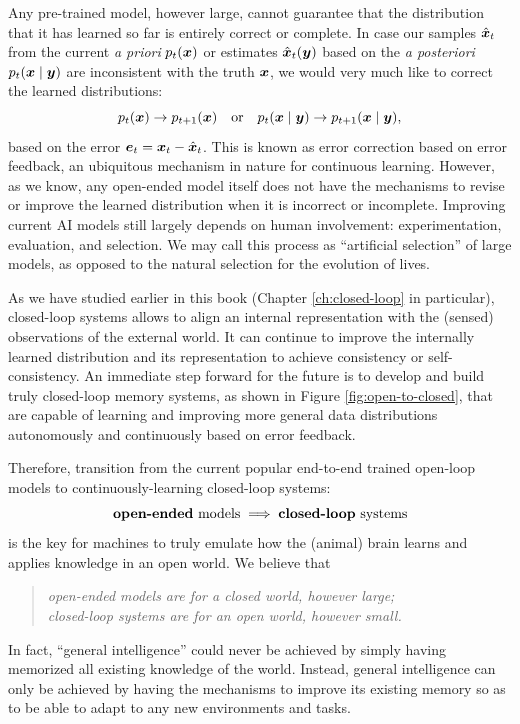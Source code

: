 \documentclass[../../book-main.tex]{subfiles}
\begin{document}
Any pre-trained model, however large, cannot guarantee that the distribution that it has learned so far is entirely correct or complete. In case our samples  $\hat{\bm{x}}_t$ from the current {\em a priori} $p_t(\bm{x})$ or estimates $\hat{\bm{x}}_t(\bm{y})$ based on the {\em a posteriori} $p_t(\bm{x}\mid \bm{y})$ are inconsistent with the truth $\bm{x}$, we would very much like to correct the learned distributions:
\begin{equation}
    p_t(\bm{x}) \rightarrow p_{t+1}(\bm{x}) \quad \mbox{or}\quad p_t(\bm{x}\mid \bm{y}) \rightarrow p_{t+1}(\bm{x}\mid \bm{y}),
\end{equation}
based on the error $\boldsymbol{e}_t = \bm{x}_t - \hat{\bm{x}}_t$. This is known as error correction based on error feedback, an ubiquitous mechanism in nature for continuous learning. However, as we know, any open-ended model itself does not have the mechanisms to revise or improve the learned distribution when it is incorrect or incomplete. Improving current AI models still largely depends on human involvement: experimentation, evaluation, and selection. We may call this process as ``artificial selection'' of large models, as opposed to the natural selection for the evolution of lives. 

As we have studied earlier in this book (Chapter \ref{ch:closed-loop} in particular), closed-loop systems allows to align an internal representation with the (sensed) observations of the external world. It can continue to improve the internally learned distribution and its representation to achieve consistency or self-consistency. An immediate step forward for the future is to develop and build truly closed-loop memory systems, as shown in Figure \ref{fig:open-to-closed}, that are capable of learning and improving more general data distributions autonomously and continuously based on error feedback. 

Therefore, transition from the current popular end-to-end trained open-loop models to continuously-learning closed-loop systems:
\begin{equation}
   \mbox{\textbf{open-ended} models} \; \Longrightarrow \; 
   \mbox{\textbf{closed-loop} systems}
\end{equation}
is the key for machines to truly emulate how the (animal) brain learns and applies knowledge in an open world. We believe that
\begin{quote}
\begin{center}
        {\em open-ended models are for a closed world, however large; \\ closed-loop systems are for an open world, however small.}
\end{center}
\end{quote}
In fact, ``general intelligence'' could never be achieved by simply having memorized all existing knowledge of the world. Instead, general intelligence can only be achieved by having the mechanisms to improve its existing memory so as to be able to adapt to any new environments and tasks. 
\end{document}
